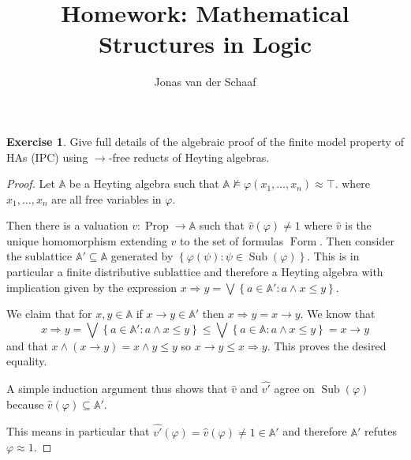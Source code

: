 \documentclass{article}
\title{Homework: Mathematical Structures in Logic}
\author{Jonas van der Schaaf}
\date{}
\newcommand{\set}[1]{\left\{#1\right\}}
\newcommand{\setwith}[2]{\set{#1:#2}}
\DeclareMathOperator{\prop}{Prop}
\DeclareMathOperator{\formulas}{Form}
\DeclareMathOperator{\subform}{Sub}
\theoremstyle{definition}
\newtheorem{question}{Exercise}
\begin{document}
\maketitle

\begin{question}
    Give full details of the algebraic proof of the finite model property of HAs
    (IPC) using \(\to\)-free reducts of Heyting algebras.

    \begin{proof}
        Let \(\mathbb{A}\) be a Heyting algebra such that
        \(\mathbb{A}\nvDash\varphi(x_{1},\ldots,x_{n})\approx\top\).
        where \(x_{1},\ldots,x_{n}\) are all free variables in \(\varphi\).

        Then there is a valuation \(v:\prop\to\mathbb{A}\) such that
        \(\widehat{v}(\varphi)\neq 1\) where \(\widehat{v}\) is the unique
        homomorphism extending \(v\) to the set of formulas \(\formulas\). Then
        consider the sublattice \(\mathbb{A}'\subseteq\mathbb{A}\) generated by
        \(\setwith{\varphi(\psi)}{\psi\in\subform(\varphi)}\). This is in
        particular a finite distributive sublattice and therefore a Heyting
        algebra with implication given by the expression \(x\Rightarrow
        y=\bigvee\setwith{a\in\mathbb{A}'}{a\wedge x\leq y}\).

        We claim that for \(x,y\in\mathbb{A}\) if \(x\to y\in\mathbb{A}'\) then
        \(x\Rightarrow y=x\to y\). We know that
        \[
            x\Rightarrow y=\bigvee\setwith{a\in\mathbb{A}'}{a\wedge x\leq y}\leq\bigvee\setwith{a\in\mathbb{A}}{a\wedge x\leq y}=x\to y
        \]
        and that \(x\wedge(x\to y)=x\wedge y\leq y\) so \(x\to y\leq
        x\Rightarrow y\). This proves the desired equality.

        A simple induction argument thus shows that \(\widehat{v}\) and
        \(\widehat{v'}\)
        agree on \(\subform(\varphi)\) because
        \(\widehat{v}(\varphi)\subseteq\mathbb{A}'\).

        This means in particular that
        \(\widehat{v'}(\varphi)=\widehat{v}(\varphi)\neq 1\in\mathbb{A'}\)
        and therefore \(\mathbb{A}'\) refutes \(\varphi\approx1\).
    \end{proof}
\end{question}
\end{document}
